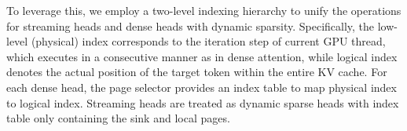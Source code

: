 To leverage this, we employ a two-level indexing hierarchy to unify the operations for streaming heads and dense heads with dynamic sparsity. Specifically, the low-level (physical) index corresponds to the iteration step of current GPU thread, which executes in a consecutive manner as in dense attention, while logical index denotes the actual position of the target token within the entire KV cache. For each dense head, the page selector provides an index table to map physical index to logical index. Streaming heads are treated as dynamic sparse heads with index table only containing the sink and local pages. 




























































































